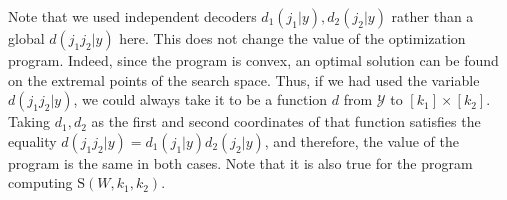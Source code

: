 Note that we used independent decoders $d_1(j_1|y),d_2(j_2|y)$ rather than a global $d(j_1j_2|y)$ here. This does not change the value of the optimization program. Indeed, since the program is convex, an optimal solution can be found on the extremal points of the search space. Thus, if we had used the variable $d(j_1j_2|y)$, we could always take it to be a function $d$ from $\mathcal{Y}$ to $[k_1]\times[k_2]$. Taking $d_1,d_2$ as the first and second coordinates of that function satisfies the equality $d(j_1j_2|y) = d_1(j_1|y)d_2(j_2|y)$, and therefore, the value of the program is the same in both cases. Note that it is also true for the program computing $\mathrm{S}(W,k_1,k_2)$.




